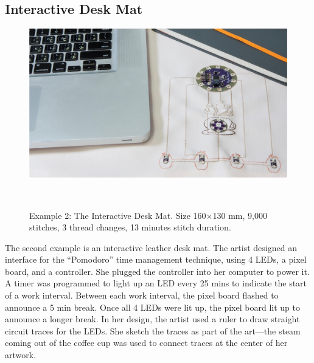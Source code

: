 \documentclass[header.tex]{subfiles}
\begin{document}
\subsection{Interactive Desk Mat}
\begin{figure} [h!]
\centering
  \includegraphics[width=1\columnwidth]{figures/DeskMat}
  \caption{Example 2: The Interactive Desk Mat. Size 160$\times$130 mm, 9,000 stitches, 3 thread changes, 13 minutes stitch duration.}~\label{fig:DeskMat}
  \vspace{-1.5em}
\end{figure}
The second example is an interactive leather desk mat. The artist designed an interface for the ``Pomodoro'' time management technique, using 4 LEDs, a pixel board, and a controller. She plugged the controller into her computer to power it. A timer was programmed to light up an LED every 25 mins to indicate the start of a work interval. Between each work interval, the pixel board flashed to announce a 5 min break. Once all 4 LEDs were lit up, the pixel board lit up to announce a longer break. In her design, the artist used a ruler to draw straight circuit traces for the LEDs. 
She sketch the traces as part of the art---the steam coming out of the coffee cup was used to connect traces at the center of her artwork. 
\end{document}
